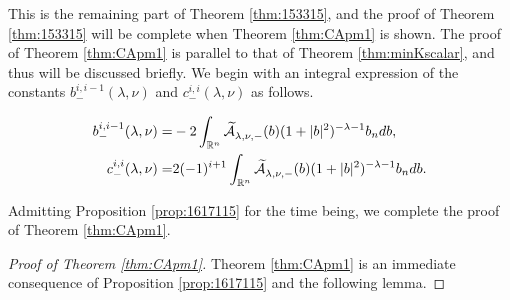 This is the remaining part
 of Theorem \ref{thm:153315}, 
 and the proof of Theorem \ref{thm:153315} will be complete
 when Theorem \ref{thm:CApm1} is shown.  
The proof of Theorem \ref{thm:CApm1} is parallel to 
 that of Theorem \ref{thm:minKscalar}, 
 and thus will be discussed briefly.  
We begin with an integral expression
 of the constants 
 $b_-^{i,i-1}(\lambda,\nu)$
 and 
 $c_-^{i,i}(\lambda,\nu)$ 
 as follows.  
\begin{proposition}
\label{prop:1617115}
\begin{align*}
b_-^{i,i-1}(\lambda,\nu)=& -2\int_{{\mathbb{R}}^n} \widetilde{{\mathcal{A}}}_{{\lambda},{\nu},{-}}^{{}}(b)
                           (1+|b|^2)^{-\lambda-1}b_n d b, 
\\
c_-^{i,i}(\lambda,\nu)=& 2(-1)^{i+1}\int_{{\mathbb{R}}^n} \widetilde{{\mathcal{A}}}_{{\lambda},{\nu},{-}}^{{}}(b)
                           (1+|b|^2)^{-\lambda-1}b_n d b.  
\end{align*}
\end{proposition}
Admitting Proposition \ref{prop:1617115} for the time being, 
 we complete the proof 
 of Theorem \ref{thm:CApm1}.  
\begin{proof}
[Proof of Theorem \ref{thm:CApm1}]
Theorem \ref{thm:CApm1} is an immediate consequence
 of Proposition \ref{prop:1617115}
 and the following lemma.  
\end{proof}



